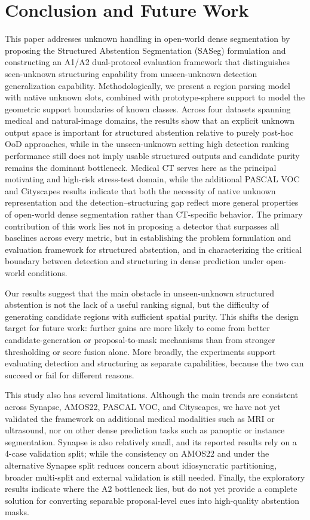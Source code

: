 \documentclass[journal]{IEEEtai}
\begin{document}
\section{Conclusion and Future Work}\label{sec:conclusion}
This paper addresses unknown handling in open-world dense segmentation by proposing
the Structured Abstention Segmentation (SASeg) formulation and constructing an A1/A2
dual-protocol evaluation framework that distinguishes seen-unknown structuring
capability from unseen-unknown detection generalization capability. Methodologically,
we present a region parsing model with native unknown slots, combined with
prototype-sphere support to model the geometric support boundaries of known classes.
Across four datasets spanning medical and natural-image domains, the results show that
an explicit unknown output space is important for structured abstention relative to
purely post-hoc OoD approaches, while in the unseen-unknown setting high detection
ranking performance still does not imply usable structured outputs and candidate purity
remains the dominant bottleneck. Medical CT serves here as the principal motivating and
high-risk stress-test domain, while the additional PASCAL VOC and Cityscapes results
indicate that both the necessity of native unknown representation and the
detection--structuring gap reflect more general properties of open-world dense
segmentation rather than CT-specific behavior. The primary contribution of this work lies
not in proposing a detector that surpasses all baselines across every metric, but in
establishing the problem formulation and evaluation framework for structured abstention,
and in characterizing the critical boundary between detection and structuring in dense
prediction under open-world conditions.

Our results suggest that the main obstacle in unseen-unknown structured abstention is
not the lack of a useful ranking signal, but the difficulty of generating candidate
regions with sufficient spatial purity. This shifts the design target for future work:
further gains are more likely to come from better candidate-generation or proposal-to-mask
mechanisms than from stronger thresholding or score fusion alone. More broadly, the
experiments support evaluating detection and structuring as separate capabilities,
because the two can succeed or fail for different reasons.

This study also has several limitations. Although the main trends are consistent across
Synapse, AMOS22, PASCAL VOC, and Cityscapes, we have not yet validated the framework on
additional medical modalities such as MRI or ultrasound, nor on other dense prediction
tasks such as panoptic or instance segmentation. Synapse is also relatively small, and
its reported results rely on a 4-case validation split; while the consistency on AMOS22
and under the alternative Synapse split reduces concern about idiosyncratic partitioning,
broader multi-split and external validation is still needed. Finally, the exploratory
results indicate where the A2 bottleneck lies, but do not yet provide a complete solution
for converting separable proposal-level cues into high-quality abstention masks.



\end{document}
